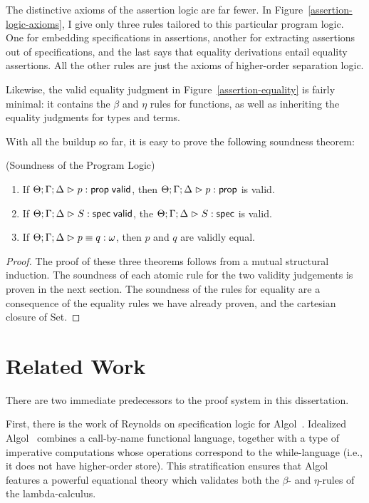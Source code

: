 The distinctive axioms of the assertion logic are far fewer. In
Figure~\ref{assertion-logic-axioms}, I give only three rules tailored
to this particular program logic. One for embedding specifications in
assertions, another for extracting assertions out of specifications,
and the last says that equality derivations entail equality
assertions. All the other rules are just the axioms of higher-order
separation logic.

Likewise, the valid equality judgment in
Figure~\ref{assertion-equality} is fairly minimal: it contains the
$\beta$ and $\eta$ rules for functions, as well as inheriting the
equality judgments for types and terms.

With all the buildup so far, it is easy to prove the following soundness
theorem:

\begin{theorem}{(Soundness of the Program Logic)}
  \begin{enumerate}
  \item If ${\Theta; \Gamma; \Delta} \vartriangleright {p} : \mathsf{prop} \;\mathsf{valid}$, then ${\Theta; \Gamma; \Delta} \vartriangleright {p} : {\mathsf{prop}}$ is valid.

  \item If ${\Theta; \Gamma; \Delta} \vartriangleright {S} : \mathsf{spec} \;\mathsf{valid}$, the ${\Theta; \Gamma; \Delta} \vartriangleright {S} : \mathsf{spec}$ is valid.

  \item If ${\Theta; \Gamma; \Delta} \vartriangleright {p} \equiv {q} : {\omega}$, then $p$ and $q$ are validly equal.
  \end{enumerate}
\end{theorem}

\begin{proof}
  The proof of these three theorems follows from a mutual structural
  induction.  The soundness of each atomic rule for the two validity
  judgements is proven in the next section. The soundness of the rules
  for equality are a consequence of the equality rules we have already
  proven, and the cartesian closure of Set.  
\end{proof}

\section{Related Work}

There are two immediate predecessors to the proof system in this
dissertation. 

First, there is the work of Reynolds on specification logic for
Algol~\cite{spec-logic}. Idealized Algol~\cite{idealized-algol}
combines a call-by-name functional language, together with a type of
imperative computations whose operations correspond to the
while-language (i.e., it does not have higher-order store). This
stratification ensures that Algol features a powerful equational
theory which validates both the $\beta$- and $\eta$-rules of the
lambda-calculus. 

